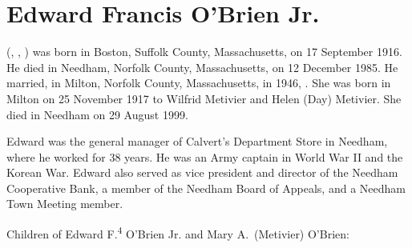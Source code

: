 \section{Edward Francis O'Brien Jr.}\label{per:Edward4OBrien}

 (, , ) was born in Boston, Suffolk County, Massachusetts, on 17 September 1916.\cite{Edward4OBrien2Birth} He died in Needham, Norfolk County, Massachusetts, on 12 December 1985.\cite{Edward4OBrien2Death,Edward2OBrien2Obit} He married, in Milton, Norfolk County, Massachusetts, in 1946, .\cite{Edward4OBrien2Marriage} She was born in Milton on 25 November 1917 to Wilfrid Metivier and Helen (Day) Metivier.\cite{MaryMetivierBirth} She died in Needham on 29 August 1999.\cite{MaryMetivierDeath}

Edward was the general manager of Calvert's Department Store in Needham, where he worked for 38 years. He was an Army captain in World War II and the Korean War. Edward also served as vice president and director of the Needham Cooperative Bank, a member of the Needham Board of Appeals, and a Needham Town Meeting member.\cite{Edward4OBrien2Obit}

\begin{KidsIntro}
	Children of Edward F.\textsuperscript{4} O'Brien Jr. and Mary A.\ (Metivier) O'Brien:
\end{KidsIntro}

\begin{Kids}
	\KidNum{}{$\bullet$}
	
	\KidNum{}{$\bullet$}
	
	\KidNum{}{$\bullet$}
	
	\KidNum{}{$\bullet$}
\end{Kids}
